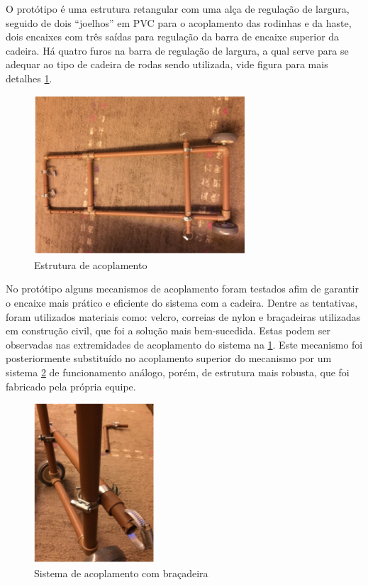 O protótipo é uma estrutura retangular com uma alça de regulação de largura, seguido de dois “joelhos” em PVC para o acoplamento das rodinhas e da haste, dois encaixes com três saídas para regulação da barra de encaixe superior da cadeira. Há quatro furos na barra de regulação de largura, a qual serve para se adequar ao tipo de cadeira de rodas sendo utilizada, vide figura para mais detalhes \ref{fig:acoplamento}.

\begin{figure}[!htb]
\centering
\includegraphics[width=0.7\textwidth]{figuras/resultados/acoplamento}
\caption{Estrutura de acoplamento}
\label{fig:acoplamento}
\end{figure}

No protótipo alguns mecanismos de acoplamento foram testados afim de garantir o encaixe mais prático e eficiente do sistema com a cadeira. Dentre as tentativas, foram utilizados materiais como: velcro, correias de nylon e braçadeiras utilizadas em construção civil, que foi a solução mais bem-sucedida. Estas podem ser observadas nas extremidades de acoplamento do sistema na \ref{fig:acoplamento}. Este mecanismo foi posteriormente substituído no acoplamento superior do mecanismo por um sistema  \ref{fig:acop_bracadeira} de funcionamento análogo, porém, de estrutura mais robusta, que foi fabricado pela própria equipe.

\begin{figure}[!htb]
\centering
\includegraphics[width=0.4\textwidth]{figuras/resultados/acop_bracadeira}
\caption{Sistema de acoplamento com braçadeira}
\label{fig:acop_bracadeira}
\end{figure}

